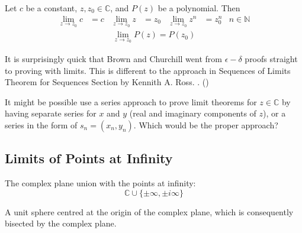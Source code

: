 \documentclass[12pt, english]{book}
\begin{document}
	\begin{corollary}
		\label{Limits of f=u+iv Theorem Corollary - Complex}
		Let $c$ be a constant, $z, z_0 \in \mathbb{C}$, and $P(z)$ be a polynomial. Then
		\begin{align*}
			\lim_{z \rightarrow z_0} c &= c & \lim_{z \rightarrow z_0} z &= z_0 &
			\lim_{z \rightarrow z_0} z^n &= z_0^n & n \in \mathbb{N}
		\end{align*}
		\begin{align*}
			\lim_{z \rightarrow z_0} P(z) = P(z_0)
		\end{align*}
	\end{corollary}

	\begin{observation}
		It is surprisingly quick that Brown and Churchill went from $\epsilon - \delta$ proofs straight to proving with limits. This is different to the approach in Sequences of Limits Theorem for Sequences Section by Kennith A. Ross. \cite{Ross.K-Elementary-Analysis-2013}. ()
	\end{observation}
	\begin{question}
		It might be possible use a series approach to prove limit theorems for $z \in \mathbb{C}$ by having separate series for $x$ and $y$ (real and imaginary components of $z$), or a series in the form of $s_n = (x_n, y_n)$. Which would be the proper approach?
	\end{question}
	
	\subsection{Limits of Points at Infinity} \label{Limits of Points at Infinity Subsection - Complex}
	
	\begin{definition} 
		The complex plane union with the points at infinity: 
		$$\mathbb{C} \cup \{\pm \infty, \pm i \infty\}$$
	\end{definition}
	
	\begin{definition} 
		A unit sphere centred at the origin of the complex plane, which is consequently bisected by the complex plane.
		\label{Riemann Sphere Definition - Complex}
	\end{definition}
\end{document}
